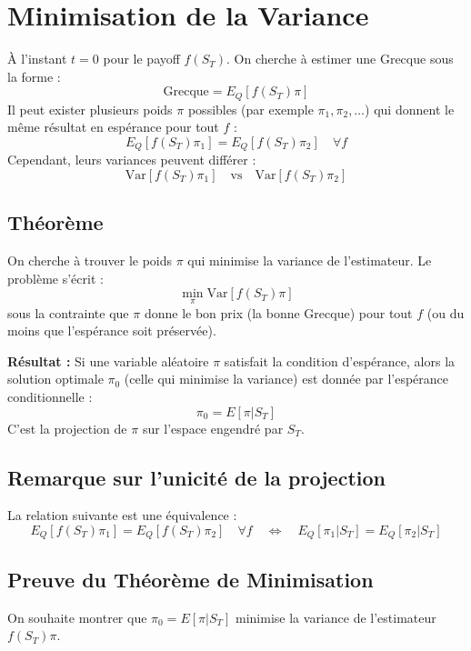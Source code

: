 \documentclass{article}
\begin{document}
\section{Minimisation de la Variance}

À l'instant $t=0$ pour le payoff $f(S_T)$.
On cherche à estimer une Grecque sous la forme :
\[
\text{Grecque} = E_Q [ f(S_T) \pi ]
\]
Il peut exister plusieurs poids $\pi$ possibles (par exemple $\pi_1, \pi_2, \dots$) qui donnent le même résultat en espérance pour tout $f$ :
\[
E_Q [ f(S_T) \pi_1 ] = E_Q [ f(S_T) \pi_2 ] \quad \forall f
\]
Cependant, leurs variances peuvent différer :
\[
\text{Var} [ f(S_T) \pi_1 ] \quad \text{vs} \quad \text{Var} [ f(S_T) \pi_2 ]
\]

\subsection{Théorème}
On cherche à trouver le poids $\pi$ qui minimise la variance de l'estimateur.
Le problème s'écrit :
\[
\min_{\pi} \text{Var} [ f(S_T) \pi ]
\]
sous la contrainte que $\pi$ donne le bon prix (la bonne Grecque) pour tout $f$ (ou du moins que l'espérance soit préservée).

\textbf{Résultat :}
Si une variable aléatoire $\pi$ satisfait la condition d'espérance, alors la solution optimale $\pi_0$ (celle qui minimise la variance) est donnée par l'espérance conditionnelle :
\[
\pi_0 = E [ \pi | S_T ]
\]
C'est la projection de $\pi$ sur l'espace engendré par $S_T$.

\subsection{Remarque sur l'unicité de la projection}
La relation suivante est une équivalence :
\[
E_Q [f(S_T) \pi_1] = E_Q [f(S_T) \pi_2] \quad \forall f \quad \Longleftrightarrow \quad E_Q [\pi_1 | S_T] = E_Q [\pi_2 | S_T]
\]

\subsection{Preuve du Théorème de Minimisation}
On souhaite montrer que $\pi_0 = E[\pi | S_T]$ minimise la variance de l'estimateur $f(S_T)\pi$.
\end{document}
